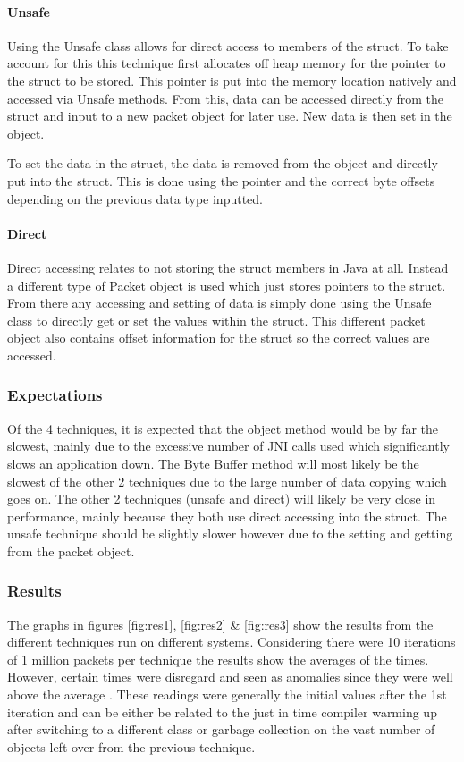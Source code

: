 \documentclass[final_report.tex]{subfiles}
\begin{document}
\paragraph*{Unsafe}
Using the Unsafe class allows for direct access to members of the struct. To take account for this this technique first allocates off heap memory for the pointer to the struct to be stored. This pointer is put into the memory location natively and accessed via Unsafe methods. From this, data can be accessed directly from the struct and input to a new packet object for later use. New data is then set in the object.

To set the data in the struct, the data is removed from the object and directly put into the struct. This is done using the pointer and the correct byte offsets depending on the previous data type inputted.

\paragraph*{Direct}
Direct accessing relates to not storing the struct members in Java at all. Instead a different type of Packet object is used which just stores pointers to the struct. From there any accessing and setting of data is simply done using the Unsafe class to directly get or set the values within the struct. This different packet object also contains offset information for the struct so the correct values are accessed.

\subsubsection{Expectations}
Of the 4 techniques, it is expected that the object method would be by far the slowest, mainly due to the excessive number of JNI calls used which significantly slows an application down. The Byte Buffer method will most likely be the slowest of the other 2 techniques due to the large number of data copying which goes on. The other 2 techniques (unsafe and direct) will likely be very close in performance, mainly because they both use direct accessing into the struct. The unsafe technique should be slightly slower however due to the setting and getting from the packet object.


\subsubsection{Results}
The graphs in figures \ref{fig:res1}, \ref{fig:res2} \& \ref{fig:res3} show the results from the different techniques run on different systems. Considering there were 10 iterations of 1 million packets per technique the results show the averages of the times. However, certain times were disregard and seen as anomalies since they were well above the average . These readings were generally the initial values after the 1st iteration and can be either be related to the just in time compiler warming up after switching to a different class or garbage collection on the vast number of objects left over from the previous technique.
\end{document}
